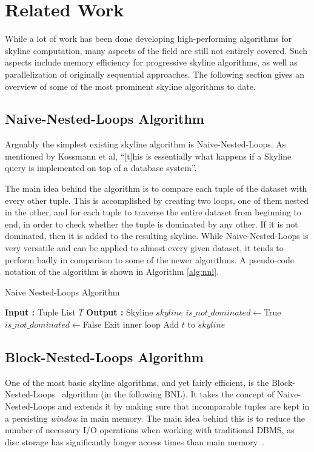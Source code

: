 \section{Related Work} \label{section:related-work}
While a lot of work has been done developing high-performing algorithms for skyline computation, many aspects of the field are still not entirely covered. Such aspects include memory efficiency for progressive skyline algorithms, as well as parallelization of originally sequential approaches. The following section gives an overview of some of the most prominent skyline algorithms to date. 

\subsection{Naive-Nested-Loops Algorithm} \label{subsection:naive-nested-loops}
Arguably the simplest existing skyline algorithm is Naive-Nested-Loops. As mentioned by Kossmann et al, ``[t]his is essentially what happens if a Skyline query is implemented on top of a database system''\cite{kossmann}. 

The main idea behind the algorithm is to compare each tuple of the dataset with every other tuple. This is accomplished by creating two loops, one of them nested in the other, and for each tuple to traverse the entire dataset from beginning to end, in order to check whether the tuple is dominated by any other. If it is not dominated, then it is added to the resulting skyline. While Naive-Nested-Loops is very versatile and can be applied to almost every given dataset, it tends to perform badly in comparison to some of the newer algorithms. A pseudo-code notation of the algorithm is shown in Algorithm \ref{alg:nnl}. 

\begin{algorithm}[h]
	\caption{Naive Nested-Loops Algorithm} \label{alg:nnl}
	\begin{algorithmic}[1] 
		\State \textbf{Input :} Tuple List $T$
		\State \textbf{Output :} Skyline $skyline$
			\State $is\_not\_dominated \gets $True
					\State $is\_not\_dominated \gets $False
					\State Exit inner loop
				\EndIf
			\EndFor
				\State Add $t$ to $skyline$
			\EndIf
		\EndFor
	\end{algorithmic}
\end{algorithm}

\subsection{Block-Nested-Loops Algorithm} \label{subsection:bnl}
One of the most basic skyline algorithms, and yet fairly efficient, is the Block-Nested-Loops~\cite{kossmann} algorithm (in the following BNL). It takes the concept of Naive-Nested-Loops and extends it by making sure that incomparable tuples are kept in a persisting \textit{window} in main memory. The main idea behind this is to reduce the number of necessary I/O operations when working with traditional DBMS, as disc storage has significantly longer access times than main memory~\cite{book-kemper}. 

